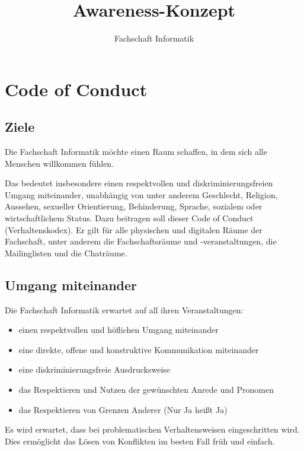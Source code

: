 \documentclass{article}
\title{Awareness-Konzept}
\author{Fachschaft Informatik}
\begin{document}
\maketitle

\section{Code of Conduct}

\subsection{Ziele}
Die Fachschaft Informatik möchte einen Raum schaffen, in dem sich alle Menschen willkommen fühlen.

Das bedeutet insbesondere einen respektvollen und diskriminierungsfreien Umgang miteinander, unabhängig von unter anderem Geschlecht, Religion, Aussehen, 
sexueller Orientierung, Behinderung, Sprache, sozialem oder wirtschaftlichem Status. Dazu beitragen soll dieser Code of Conduct (Verhaltenskodex). Er gilt für alle 
physischen und digitalen Räume der Fachschaft, unter anderem die Fachschaftsräume und -veranstaltungen, die Mailinglisten und die Chaträume.

\subsection{Umgang miteinander}
Die Fachschaft Informatik erwartet auf all ihren Veranstaltungen:
\begin{itemize}
    \item einen respektvollen und höflichen Umgang miteinander
    \item eine direkte, offene und konstruktive Kommunikation miteinander
    \item eine diskriminierungsfreie Ausdrucksweise
    \item das Respektieren und Nutzen der gewünschten Anrede und Pronomen 
    \item das Respektieren von Grenzen Anderer (Nur Ja heißt Ja)
\end{itemize}
Es wird erwartet, dass bei problematischen Verhaltensweisen eingeschritten wird. Dies ermöglicht das Lösen von Konflikten im besten Fall früh und einfach.
\end{document}

